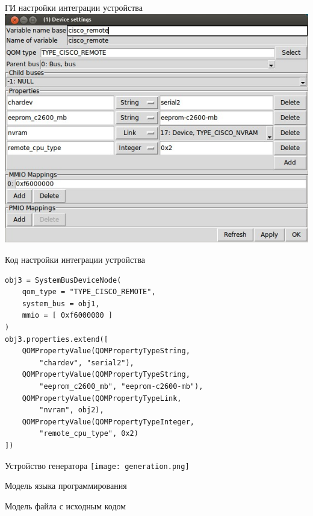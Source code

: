 \documentclass[unicode,hyperref={unicode=true}]{beamer}
\theoremstyle{definition}
\theoremstyle{plain}
\begin{document}
\begin{frame}{ГИ настройки интеграции устройства}
\includegraphics[height=0.9\textheight]{REMOTE.jpg}
\end{frame}



\begin{frame}[fragile]{Код настройки интеграции устройства}

\lstset{language=Python}
\begin{lstlisting}
obj3 = SystemBusDeviceNode(
    qom_type = "TYPE_CISCO_REMOTE",
    system_bus = obj1,
    mmio = [ 0xf6000000 ]
)
obj3.properties.extend([
    QOMPropertyValue(QOMPropertyTypeString,
        "chardev", "serial2"),
    QOMPropertyValue(QOMPropertyTypeString,
        "eeprom_c2600_mb", "eeprom-c2600-mb"),
    QOMPropertyValue(QOMPropertyTypeLink,
        "nvram", obj2),
    QOMPropertyValue(QOMPropertyTypeInteger,
        "remote_cpu_type", 0x2)
])
\end{lstlisting}

\end{frame}



\begin{frame}{Устройство генератора}
\texttt{[image: generation.png]}
\end{frame}



\begin{frame}{Модель языка программирования}
\end{frame}



\begin{frame}{Модель файла с исходным кодом}
\end{frame}
\end{document}
